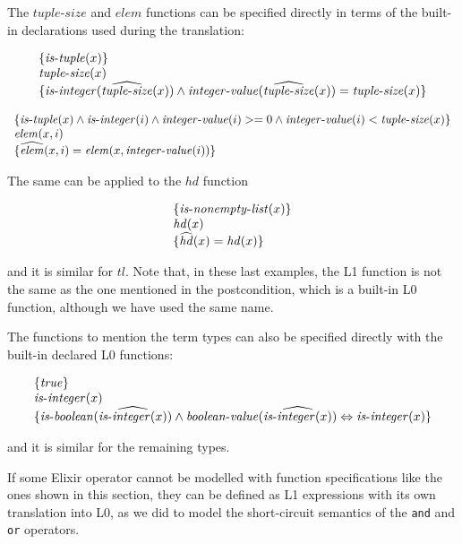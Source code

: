 The $\mathit{tuple\mbox{-}size}$ and $\mathit{elem}$ functions can be specified directly 
in terms of the built-in declarations used during the translation:

\[
\begin{array}{l}
\{ \mathit{is\mbox{-}tuple}(x) \}\\
\mathit{tuple\mbox{-}size}(x)\\
\{ \mathit{is\mbox{-}integer}(\widehat{\mathit{tuple\mbox{-}size}}(x)) \wedge 
  \mathit{integer\mbox{-}value}(\widehat{\mathit{tuple\mbox{-}size}}(x)) = \mathit{tuple\mbox{-}size}(x) \}
\end{array}
\]

\[
\begin{array}{l}
\{ \mathit{is\mbox{-}tuple}(x) \wedge \mathit{is\mbox{-}integer}(i) \wedge \mathit{integer\mbox{-}value}(i) >= 0 \wedge \mathit{integer\mbox{-}value}(i) < \mathit{tuple\mbox{-}size}(x) \}\\
\mathit{elem}(x, i)\\
\{ \widehat{\mathit{elem}}(x, i) = \mathit{elem}(x, \mathit{integer\mbox{-}value}(i)) \}
\end{array}
\]

The same can be applied to the $\mathit{hd}$ function

\[
\begin{array}{l}
\{ \mathit{is\mbox{-}nonempty\mbox{-}list}(x) \}\\
\mathit{hd}(x)\\
\{ \widehat{\mathit{hd}}(x) = \mathit{hd}(x) \}
\end{array}
\]

and it is similar for $\mathit{tl}$. Note that, in these last examples, 
the L1 function is not the same as the one mentioned in the postcondition,
which is a built-in L0 function, although we have used the same name.

The functions to mention the term types can also be specified 
directly with the built-in declared L0 functions:

\[
\begin{array}{l}
\{ \mathit{true} \}\\
\mathit{is\mbox{-}integer}(x)\\
\{ \mathit{is\mbox{-}boolean}(\widehat{\mathit{is\mbox{-}integer}(x)}) \wedge 
  \mathit{boolean\mbox{-}value}(\widehat{\mathit{is\mbox{-}integer}(x)}) \Leftrightarrow \mathit{is\mbox{-}integer}(x) \}
\end{array}
\]

and it is similar for the remaining types.

If some Elixir operator cannot be modelled with function specifications like the
ones shown in this section, they can be defined as L1 expressions with its own 
translation into L0, as we did to model the short-circuit semantics of the 
\verb|and| and \verb|or| operators.

